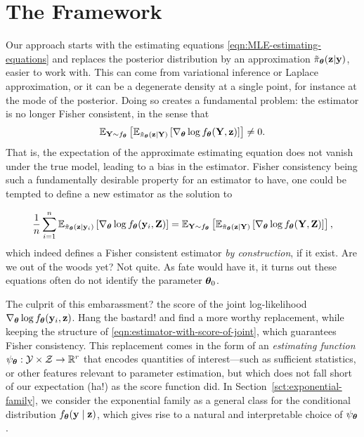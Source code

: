 \documentclass[twoside,11pt]{article}
\begin{document}
\section{The Framework}

Our approach starts with the estimating equations \eqref{eqn:MLE-estimating-equations} and replaces the posterior distribution by an approximation $\tilde\pi_{\bm{\theta}}({\bf z}|{\bf y})$, easier to work with. This can come from variational inference or Laplace approximation, or it can be a degenerate density at a single point, for instance at the mode of the posterior. Doing so creates a fundamental problem: the estimator is no longer Fisher consistent, in the sense that
%
\begin{equation}
    \mathbb{E}_{{\bf Y} \sim f_{\bm{\theta}}} \left[ \mathbb{E}_{\tilde\pi_{\bm{\theta}}({\bf z} \mid {\bf Y})} \left[ \nabla_{\bm{\theta}} \log f_{\bm{\theta}}({\bf Y}, {\bf z}) \right] \right] \neq 0.
\end{equation}
%
That is, the expectation of the approximate estimating equation does not vanish under the true model, leading to a bias in the estimator. Fisher consistency being such a fundamentally desirable property for an estimator to have, one could be tempted to define a new estimator as the solution to

\begin{equation}
\label{eqn:estimator-with-score-of-joint}
    \frac{1}{n}\sum_{i=1}^n \mathbb{E}_{\tilde\pi_{\bm{\theta}}({\bf z} \mid {\bf y}_i)} \left[ \nabla_{\bm{\theta}} \log f_{\bm{\theta}}({\bf y}_i, {\bf Z}) \right] = 
    \mathbb{E}_{{\bf Y} \sim f_{\bm{\theta}}} \left[ \mathbb{E}_{\tilde\pi_{\bm{\theta}}({\bf z} \mid {\bf Y})} \left[ \nabla_{\bm{\theta}} \log f_{\bm{\theta}}({\bf Y}, {\bf Z}) \right] \right],
\end{equation}
%
which indeed defines a Fisher consistent estimator \textit{by construction}, if it exist. Are we out of the woods yet? Not quite. As fate would have it, it turns out these equations often do not identify the parameter ${\bm{\theta}}_0$.

The culprit of this embarassment? the score of the joint log-likelihood $\nabla_{\bm{\theta}} \log f_{\bm{\theta}}({\bf y}_i, {\bf z})$. Hang the bastard! and find a more worthy replacement, while keeping the structure of \eqref{eqn:estimator-with-score-of-joint}, which guarantees Fisher consistency. This replacement comes in the form of an \textit{estimating function} $\psi_{\bm{\theta}} : \mathcal{Y} \times \mathcal{Z} \to \mathbb{R}^r$ that encodes quantities of interest—such as sufficient statistics, or other features relevant to parameter estimation, but which does not fall short of our expectation (ha!) as the score function did. In Section~\ref{sct:exponential-family}, we consider the exponential family as a general class for the conditional distribution $f_{\bm{\theta}}({\bf y} \mid {\bf z})$, which gives rise to a natural and interpretable choice of $\psi_{\bm{\theta}}$.
\end{document}
